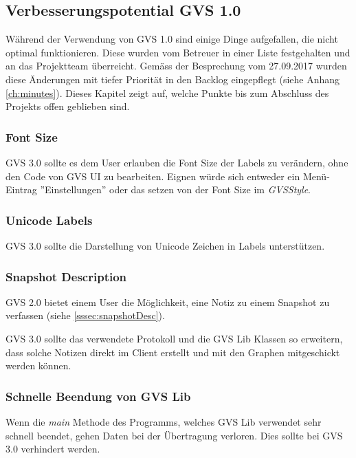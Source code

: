 \documentclass[11pt,a4paper,english,oneside]{book}
\numberwithin{equation}{chapter}
\begin{document}
	\subsection{Verbesserungspotential GVS 1.0}
	Während der Verwendung von GVS 1.0 sind einige Dinge aufgefallen, die nicht optimal funktionieren. Diese wurden vom Betreuer in einer Liste festgehalten und an das Projektteam überreicht. Gemäss der Besprechung vom 27.09.2017 wurden diese Änderungen mit tiefer Priorität in den Backlog eingepflegt (siehe Anhang \ref{ch:minutes}). Dieses Kapitel zeigt auf, welche Punkte bis zum Abschluss des Projekts offen geblieben sind.
	
	\subsubsection{Font Size}
	GVS 3.0 sollte es dem User erlauben die Font Size der Labels zu verändern, ohne den Code von GVS UI zu bearbeiten. Eignen würde sich entweder ein Menü-Eintrag ''Einstellungen'' oder das setzen von der Font Size im \textit{GVSStyle}.
	
	\subsubsection{Unicode Labels}
	GVS 3.0 sollte die Darstellung von Unicode Zeichen in Labels unterstützen.
	
	\subsubsection{Snapshot Description}
	GVS 2.0 bietet einem User die Möglichkeit, eine Notiz zu einem Snapshot zu verfassen (siehe \ref{sssec:snapshotDesc}).
	
	GVS 3.0 sollte das verwendete Protokoll und die GVS Lib Klassen so erweitern, dass solche Notizen direkt im Client erstellt und mit den Graphen mitgeschickt werden können.
	
	\subsubsection{Schnelle Beendung von GVS Lib}
	Wenn die \textit{main} Methode des Programms, welches GVS Lib verwendet sehr schnell beendet, gehen Daten bei der Übertragung verloren. Dies sollte bei GVS 3.0 verhindert werden.
	
	\newpage
	
	\appendix
	\noappendicestocpagenum
	\addappheadtotoc
	\appendixpage
	
\end{document}
